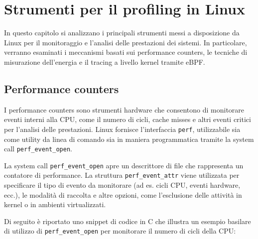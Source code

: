 \documentclass{article}
\begin{document}
\clearpage
\section{Strumenti per il profiling in Linux}

In questo capitolo si analizzano i principali strumenti messi a disposizione da Linux per il monitoraggio e l'analisi delle prestazioni dei sistemi. In particolare, verranno esaminati i meccanismi basati sui performance counters, le tecniche di misurazione dell'energia e il tracing a livello kernel tramite eBPF.

\subsection{Performance counters}

I performance counters sono strumenti hardware che consentono di monitorare eventi interni alla CPU, come il numero di cicli, cache misses e altri eventi critici per l'analisi delle prestazioni. Linux fornisce l'interfaccia \texttt{perf}, utilizzabile sia come utility da linea di comando sia in maniera programmatica tramite la system call \texttt{perf\_event\_open}.

La system call \texttt{perf\_event\_open} apre un descrittore di file che rappresenta un contatore di performance. La struttura \texttt{perf\_event\_attr} viene utilizzata per specificare il tipo di evento da monitorare (ad es. cicli CPU, eventi hardware, ecc.), le modalità di raccolta e altre opzioni, come l'esclusione delle attività in kernel o in ambienti virtualizzati.

Di seguito è riportato uno snippet di codice in C che illustra un esempio basilare di utilizzo di \texttt{perf\_event\_open} per monitorare il numero di cicli della CPU:
\end{document}
